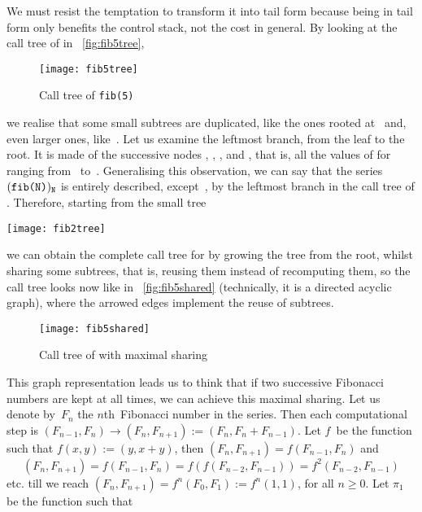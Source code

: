 We must resist the temptation to transform it into tail form because
being in tail form only benefits the control stack, not the cost in
general. By looking at the call tree of  in
\fig~\vref{fig:fib5tree},
\begin{figure}
\centering
\texttt{[image: fib5tree]}
\caption{Call tree of \texttt{fib(5)}}
\label{fig:fib5tree}
\end{figure}
we realise that some small subtrees are duplicated, like the ones
rooted at~ and, even larger ones,
like~. Let us examine the leftmost branch, from the
leaf to the root. It is made of the successive nodes ,
, ,  and
, that is, all the values of 
for~ ranging from~ to~. Generalising
this observation, we can say that the series
\((\texttt{fib(N)})_{\texttt{N}}\) is entirely described,
except~, by the leftmost branch in the call tree of
. Therefore, starting from the small tree
\begin{center}
\texttt{[image: fib2tree]}
\end{center}
we can obtain the complete call tree for  by growing
the tree from the root, whilst sharing some subtrees, that is, reusing
them instead of recomputing them, so the call tree looks now like in
\fig~\vref{fig:fib5shared} (technically, it is a directed acyclic
graph), where the arrowed edges implement the reuse of subtrees.
\begin{figure}[b]
\centering
\texttt{[image: fib5shared]}
\caption{Call tree of  with maximal sharing}
\label{fig:fib5shared}
\end{figure}
This graph representation leads us to think that if two successive
Fibonacci numbers are kept at all times, we can achieve this maximal
sharing. Let us denote by~\(F_n\) the \(n\)th~Fibonacci number in the
series. Then each computational step is \((F_{n-1},F_{n}) \rightarrow
(F_{n}, F_{n+1}) := (F_{n},F_{n}+F_{n-1})\). Let \(f\)~be the function
such that \(f(x,y) := (y,x+y)\), then \((F_{n},F_{n+1}) =
f(F_{n-1},F_{n})\) and
\begin{equation*}
(F_n,F_{n+1}) = f(F_{n-1},F_{n}) = f(f(F_{n-2},F_{n-1})) =
f^2(F_{n-2},F_{n-1})
\end{equation*}
etc. till we reach \((F_{n},F_{n+1}) = f^n(F_0,F_1) := f^{n}(1,1)\),
for all \(n \geqslant 0\). Let \(\pi_1\) be the function such that
